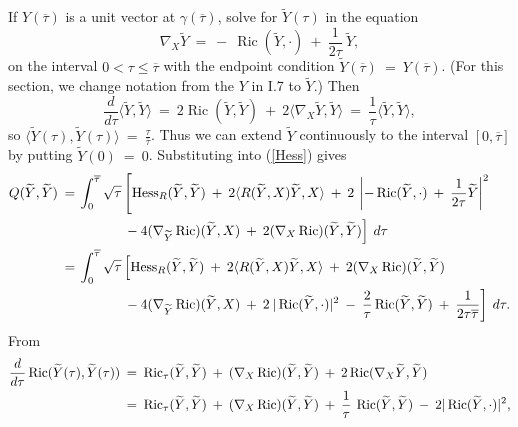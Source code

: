 \documentclass[12pt]{amsart}
\newcommand{\Hess}{\operatorname{Hess}}
\newcommand{\Ric}{\operatorname{Ric}}
\numberwithin{equation}{section}
\theoremstyle{plain}
\theoremstyle{definition}
\theoremstyle{remark}
\begin{document}
If $Y(\overline{\tau})$ 
is a unit vector at $\gamma(\overline{\tau})$, solve for
$\widetilde{Y}(\tau)$ in the equation
\begin{equation} \label{diffeq}
\nabla_X \widetilde{Y} \: = \: - \: \Ric(\widetilde{Y}, \cdot) 
\: + \: \frac{1}{2\tau} \:\widetilde{Y},
\end{equation}
on the interval $0<\tau\leq \overline{\tau}$ with the endpoint condition
$\widetilde{Y}(\overline{\tau}) \: = \: 
Y(\overline{\tau})$.
(For this section, we change notation from the
$Y$ in I.7 to $\widetilde{Y}$.)
Then
\begin{equation}
\frac{d}{d\tau} \langle \widetilde{Y}, \widetilde{Y} \rangle \: = \: 
2 \Ric(\widetilde{Y}, \widetilde{Y})
\: + \: 2 \langle \nabla_X \widetilde{Y}, \widetilde{Y} \rangle \: = \:
\frac{1}{\tau} \langle \widetilde{Y}, \widetilde{Y} \rangle,
\end{equation}
so
$\langle \widetilde{Y}(\tau), \widetilde{Y}(\tau) \rangle \: = \: 
\frac{\tau}{\overline{\tau}}$.
Thus we can extend $\widetilde{Y}$ continuously to the interval $[0,\overline{\tau}]$
by putting $\widetilde{Y}(0) \: = \: 0$.
Substituting into
(\ref{Hess}) gives
\begin{align} \label{sub1}
Q(\widetilde{Y}, \widetilde{Y}) \: = \: & \int_0^{\overline{\tau}}
\sqrt{\tau} \left[\Hess_R (\widetilde{Y},\widetilde{Y}) \: + \: 
2 \langle R(\widetilde{Y}, X) \widetilde{Y}, X \rangle 
\: + \: 2 \: \left| - \Ric(\widetilde{Y}, \cdot) \: + \:
\frac{1}{2\tau} \widetilde{Y} \right|^2 \right. \\
&
\: \: \: \: \: \: \: \: \: \: \: \: \: \: \:
 \left. - \: 4 (\nabla_{\widetilde{Y}} \Ric) (\widetilde{Y}, X) \: + \: 2
(\nabla_X \Ric) (\widetilde{Y}, \widetilde{Y}) \right] \: d\tau \notag \\
= \: & \int_0^{\overline{\tau}}
\sqrt{\tau} \left[\Hess_R (\widetilde{Y},\widetilde{Y}) \: + \: 
2 \langle R(\widetilde{Y}, X) \widetilde{Y}, X \rangle  \: + \: 2
(\nabla_X \Ric) (\widetilde{Y}, \widetilde{Y}) \: \right. \notag \\
&
\: \: \: \: \: \: \: \: \: \: \: \: \: \: \:
\left. - \: 4 (\nabla_{\widetilde{Y}} \Ric) (\widetilde{Y}, X) \:
+ \: 2 \: |\Ric(\widetilde{Y}, \cdot)|^2 \: - \: \frac{2}{\tau} 
\Ric(\widetilde{Y}, \widetilde{Y})
\: + \:
\frac{1}{2\tau \overline{\tau}}
\right] \: d\tau. \notag 
\end{align}
From
\begin{align}
\frac{d}{d\tau} \Ric(\widetilde{Y}(\tau), \widetilde{Y}(\tau)) \: & = \:
\Ric_\tau(\widetilde{Y}, \widetilde{Y}) \: + \: 
(\nabla_X \Ric)(\widetilde{Y}, \widetilde{Y}) \: + \: 2 
\Ric(\nabla_X \widetilde{Y}, \widetilde{Y}) \\
& = \: \Ric_\tau(\widetilde{Y}, \widetilde{Y}) \: + \: 
(\nabla_X \Ric)(\widetilde{Y}, \widetilde{Y}) \: + \:
\frac{1}{\tau} \: \Ric(\widetilde{Y}, \widetilde{Y}) \: - \: 
2 |\Ric(\widetilde{Y}, \cdot)|^2, \notag
\end{align}
\end{document}
